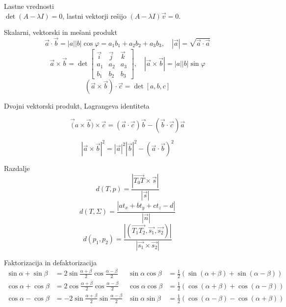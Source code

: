 \documentclass[a4paper,10pt]{article}
\begin{document}
\begin{multicols}{2}
\begin{formulaBox}{Lastne vrednosti}
	\\
$\det(A-\lambda I)=0$, lastni vektorji rešijo $(A-\lambda I)\vec v=0$.
\end{formulaBox}

\begin{formulaBox}{Skalarni, vektorski in mešani produkt}
\[
\vec a\cdot \vec b = |a||b|\cos\varphi =a_1b_1+a_2b_2+a_3b_3,\quad |\vec a|=\sqrt{\vec a\cdot \vec a}
\]
\[
\vec a\times \vec b = 
\det\begin{bmatrix}
\vec i & \vec j & \vec k\\
a_1 & a_2 & a_3\\
b_1 & b_2 & b_3
\end{bmatrix},\quad
|\vec a\times \vec b|=|a||b|\sin\varphi
\]
\[
(\vec a\times \vec b)\cdot \vec c = \det[a,b,c]
\]
\end{formulaBox}

\begin{formulaBox}{Dvojni vektorski produkt, Lagrangeva identiteta}

\[
\vec (a\times\vec b)\times \vec c= (\vec a\cdot \vec c)\vec b-(\vec b\cdot \vec c)\vec a
\]

\[
|\vec a\times \vec b|^2=|\vec a|^2|\vec b|^2-(\vec a\cdot \vec b)^2
\]
\end{formulaBox}

\begin{formulaBox}{Razdalje}
    \[d(T, p) = \frac{|\overrightarrow{T_0T} \times \vec{s}|}{|\vec{s}|}\]
    \[d(T, \Sigma) = \frac{|at_x + bt_y + ct_z - d|}{|\vec{n}|}\]
    \[d(p_1, p_2) = \frac{|(\overrightarrow{T_1T_2}, \vec{s_1}, \vec{s_2})|}{|\vec{s_1} \times \vec{s_2}|}\]
\end{formulaBox}

\end{multicols}
\begin{formulaBox}{Faktorizacija in defaktorizacija}
\begin{align*}
\sin \alpha + \sin \beta &= 2 \sin \frac{\alpha + \beta}{2} \cos \frac{\alpha - \beta}{2} & \sin \alpha \cos \beta &= \frac{1}{2}(\sin(\alpha + \beta) + \sin(\alpha - \beta)) \\
\cos \alpha + \cos \beta &= 2 \cos \frac{\alpha + \beta}{2} \cos \frac{\alpha - \beta}{2} & \cos \alpha \cos \beta &= \frac{1}{2}(\cos(\alpha + \beta) + \cos(\alpha - \beta)) \\
\cos \alpha - \cos \beta &= -2 \sin \frac{\alpha + \beta}{2} \sin \frac{\alpha - \beta}{2} & \sin \alpha \sin \beta &= \frac{1}{2}(\cos(\alpha - \beta) - \cos(\alpha + \beta))
\end{align*}
\end{formulaBox}
\end{document}
